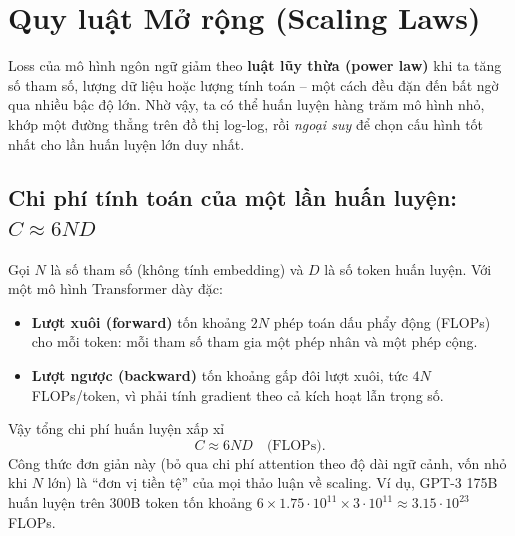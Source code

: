 
\section{Quy luật Mở rộng (Scaling Laws) \newtag}
\label{sec:scaling_laws}

\begin{tcolorbox}[title={Trực giác cốt lõi}, colback=yellow!10!white, colframe=yellow!50!black, fonttitle=\bfseries]
Loss của mô hình ngôn ngữ giảm theo \textbf{luật lũy thừa (power law)} khi ta tăng số tham số, lượng dữ liệu hoặc lượng tính toán -- một cách đều đặn đến bất ngờ qua nhiều bậc độ lớn. Nhờ vậy, ta có thể huấn luyện hàng trăm mô hình nhỏ, khớp một đường thẳng trên đồ thị log-log, rồi \emph{ngoại suy} để chọn cấu hình tốt nhất cho lần huấn luyện lớn duy nhất.
\end{tcolorbox}

\subsection{Chi phí tính toán của một lần huấn luyện: $C \approx 6ND$}
\label{ssec:compute_6nd}
Gọi $N$ là số tham số (không tính embedding) và $D$ là số token huấn luyện. Với một mô hình Transformer dày đặc:
\begin{itemize}
	\item \textbf{Lượt xuôi (forward)} tốn khoảng $2N$ phép toán dấu phẩy động (FLOPs) cho mỗi token: mỗi tham số tham gia một phép nhân và một phép cộng.
	\item \textbf{Lượt ngược (backward)} tốn khoảng gấp đôi lượt xuôi, tức $4N$ FLOPs/token, vì phải tính gradient theo cả kích hoạt lẫn trọng số.
\end{itemize}
Vậy tổng chi phí huấn luyện xấp xỉ
\begin{equation}
	C \approx 6ND \quad \text{(FLOPs)}.
	\label{eq:compute_6nd}
\end{equation}
Công thức đơn giản này (bỏ qua chi phí attention theo độ dài ngữ cảnh, vốn nhỏ khi $N$ lớn) là “đơn vị tiền tệ” của mọi thảo luận về scaling. Ví dụ, GPT-3 175B huấn luyện trên 300B token tốn khoảng $6 \times 1.75\cdot 10^{11} \times 3\cdot 10^{11} \approx 3.15 \cdot 10^{23}$ FLOPs.

